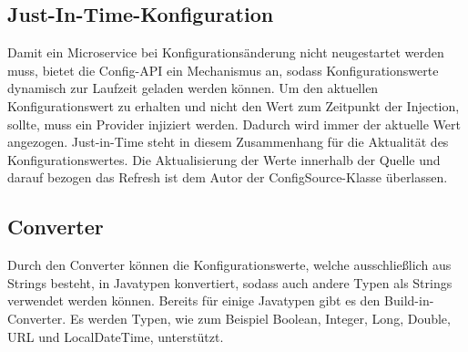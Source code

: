 \subsection{Just-In-Time-Konfiguration} 
Damit ein Microservice bei Konfigurationsänderung nicht neugestartet werden muss, bietet die Config-API ein Mechanismus an, sodass Konfigurationswerte dynamisch zur Laufzeit geladen werden können. Um den aktuellen Konfigurationswert zu erhalten und nicht den Wert zum Zeitpunkt der Injection, sollte, muss ein Provider injiziert werden. Dadurch wird immer der aktuelle Wert angezogen. Just-in-Time steht in diesem Zusammenhang für die Aktualität des Konfigurationswertes. Die Aktualisierung der Werte innerhalb der Quelle und darauf bezogen das Refresh ist dem Autor der ConfigSource-Klasse überlassen. 

\subsection{Converter}
Durch den Converter können die Konfigurationswerte, welche ausschließlich aus Strings besteht, in Javatypen konvertiert, sodass auch andere Typen als Strings verwendet werden können. Bereits für einige Javatypen gibt es den Build-in-Converter. Es werden Typen, wie zum Beispiel Boolean, Integer, Long, Double, URL und LocalDateTime, unterstützt.
